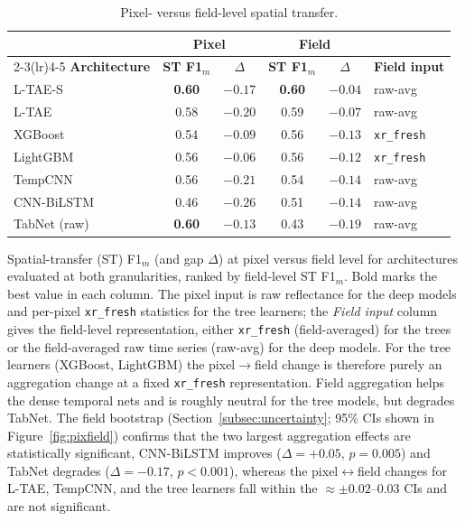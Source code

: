 \documentclass[pdflatex,sn-mathphys]{sn-jnl} %
\begin{document}
\begin{table}[htbp]
\centering
\caption{Pixel- versus field-level spatial transfer.}
\label{tab:pixfield}
\renewcommand{\arraystretch}{1.1}
\setlength{\tabcolsep}{5.5pt}
\begin{tabular}{lccccl}
\toprule
 & \multicolumn{2}{c}{\textbf{Pixel}} & \multicolumn{2}{c}{\textbf{Field}} & \\
\cmidrule(lr){2-3}\cmidrule(lr){4-5}
\textbf{Architecture} & \textbf{ST F1$_m$} & \textbf{$\Delta$} & \textbf{ST F1$_m$} & \textbf{$\Delta$} & \textbf{Field input} \\
\midrule
L-TAE-S    & \textbf{0.60} & $-0.17$         & \textbf{0.60} & $\mathbf{-0.04}$ & raw-avg \\
L-TAE      & 0.58          & $-0.20$         & 0.59          & $-0.07$         & raw-avg \\
XGBoost    & 0.54          & $-0.09$         & 0.56          & $-0.13$         & \texttt{xr\_fresh} \\
LightGBM   & 0.56          & $\mathbf{-0.06}$ & 0.56          & $-0.12$         & \texttt{xr\_fresh} \\
TempCNN    & 0.56          & $-0.21$         & 0.54          & $-0.14$         & raw-avg \\
CNN-BiLSTM & 0.46          & $-0.26$         & 0.51          & $-0.14$         & raw-avg \\
TabNet (raw) & \textbf{0.60} & $-0.13$         & 0.43          & $-0.19$         & raw-avg \\
\bottomrule
\end{tabular}

\par\vspace{4pt}
{\footnotesize Spatial-transfer (ST) F1$_m$ (and gap $\Delta$) at pixel versus field level for
architectures evaluated at both granularities, ranked by field-level ST F1$_m$. Bold marks
the best value in each column. The pixel input is raw reflectance for
the deep models and per-pixel \texttt{xr\_fresh} statistics for the tree learners; the
\emph{Field input} column gives the field-level representation, either \texttt{xr\_fresh}
(field-averaged) for the trees or the field-averaged raw time series (raw-avg) for the
deep models. For the tree learners (XGBoost, LightGBM) the pixel$\rightarrow$field change
is therefore purely an aggregation change at a fixed \texttt{xr\_fresh} representation.
Field aggregation helps the dense temporal nets and is roughly neutral for the tree
models, but degrades TabNet. The field bootstrap (Section~\ref{subsec:uncertainty};
95\% CIs shown in Figure~\ref{fig:pixfield}) confirms that the two largest aggregation
effects are statistically significant, CNN-BiLSTM improves ($\Delta=+0.05$, $p=0.005$)
and TabNet degrades ($\Delta=-0.17$, $p<0.001$), whereas the pixel$\leftrightarrow$field
changes for L-TAE, TempCNN, and the tree learners fall within the $\approx\pm0.02$--$0.03$
CIs and are not significant.\par}
\end{table}
\end{document}
